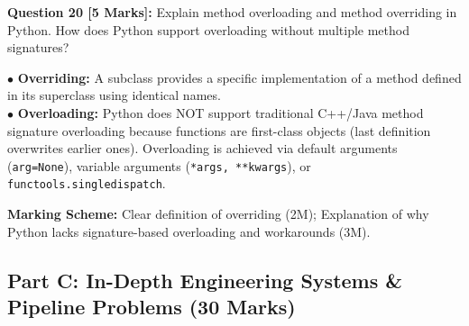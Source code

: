 \noindent\textbf{Question 20 [5 Marks]:} Explain method overloading and method overriding in Python. How does Python support overloading without multiple method signatures?
\begin{solutionbox}
$\bullet$ \textbf{Overriding:} A subclass provides a specific implementation of a method defined in its superclass using identical names.\\
$\bullet$ \textbf{Overloading:} Python does NOT support traditional C++/Java method signature overloading because functions are first-class objects (last definition overwrites earlier ones). Overloading is achieved via default arguments (\texttt{arg=None}), variable arguments (\texttt{*args, **kwargs}), or \texttt{functools.singledispatch}.
\end{solutionbox}
\begin{markingrubric}
\textbf{Marking Scheme:} Clear definition of overriding (2M); Explanation of why Python lacks signature-based overloading and workarounds (3M).
\end{markingrubric}

\subsection*{Part C: In-Depth Engineering Systems \& Pipeline Problems (30 Marks)}

